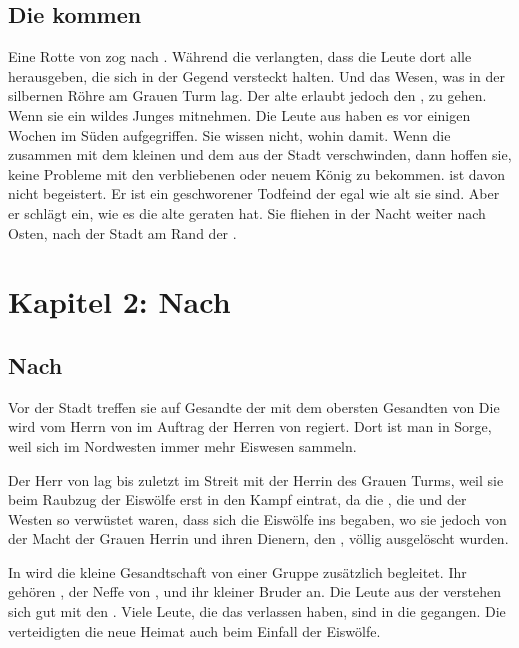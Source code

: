 \begin{huge}
\section{Die \Bangiri kommen}
Eine Rotte von \Bangiri zog nach \Lobarn.
Während die \Bangiri verlangten, dass die Leute dort alle \Schattenjager herausgeben, die sich in der Gegend versteckt halten. Und das Wesen, was in der silbernen Röhre am Grauen Turm lag.
Der alte \Vester erlaubt jedoch den , zu gehen. Wenn sie ein wildes \Bangiri{-}Junges mitnehmen. Die Leute aus \Lobarn haben es vor einigen Wochen im Süden aufgegriffen. Sie wissen nicht, wohin damit. Wenn die \Schattenjager zusammen mit dem kleinen \Bangiri und dem \Sturmkind \Sena aus der Stadt verschwinden, dann hoffen sie, keine Probleme mit den verbliebenen \Bangiri oder  neuem König zu bekommen. \Eno ist davon nicht begeistert. Er ist ein geschworener Todfeind der \Bangiri{,} egal wie alt sie sind. Aber er schlägt ein, wie es die alte \Naimo geraten hat. Sie fliehen in der Nacht weiter nach Osten, nach der Stadt \Mundis am Rand der \Nordmark.

\chapter{Kapitel 2: Nach \Rhingell}

\section{Nach \Mundis}
Vor der Stadt \Mundis treffen sie auf Gesandte der \Nordmark mit dem obersten Gesandten \Arn von  Die \Nordmark wird vom Herrn von \Bornhold im Auftrag der Herren von \Rhingell regiert. Dort ist man in Sorge, weil sich im Nordwesten immer mehr Eiswesen sammeln.

Der Herr von \Bornhold lag bis zuletzt im Streit mit der Herrin des Grauen Turms, weil sie beim Raubzug der Eiswölfe erst in den Kampf  eintrat, da die \Nordmark, die \Bergmark und der Westen  so verwüstet waren, dass sich die Eiswölfe ins \Enland begaben, wo sie jedoch von der Macht der Grauen Herrin und ihren Dienern, den \Bangiri, völlig ausgelöscht wurden. 

In \Mundis wird die kleine Gesandtschaft von einer Gruppe \Schattenjager zusätzlich begleitet. Ihr gehören \Nox, der Neffe von \Eno, \Umbra und ihr kleiner Bruder \Tremor an. Die Leute aus der \Nordmark verstehen sich gut mit den . Viele Leute, die das \Enland verlassen haben, sind in die \Nordmark gegangen. Die \Schattenjager verteidigten die neue Heimat auch beim Einfall der Eiswölfe. 


\end{huge}
